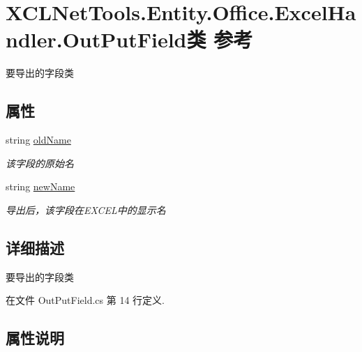 \hypertarget{class_x_c_l_net_tools_1_1_entity_1_1_office_1_1_excel_handler_1_1_out_put_field}{}\section{X\+C\+L\+Net\+Tools.\+Entity.\+Office.\+Excel\+Handler.\+Out\+Put\+Field类 参考}
\label{class_x_c_l_net_tools_1_1_entity_1_1_office_1_1_excel_handler_1_1_out_put_field}


要导出的字段类  


\subsection*{属性}
\begin{DoxyCompactItemize}
\item 
string \hyperlink{class_x_c_l_net_tools_1_1_entity_1_1_office_1_1_excel_handler_1_1_out_put_field_a6f62cc17246410ac6f6a352cd04bc1a2}{old\+Name}
\begin{DoxyCompactList}\small\item\em 该字段的原始名 \end{DoxyCompactList}\item 
string \hyperlink{class_x_c_l_net_tools_1_1_entity_1_1_office_1_1_excel_handler_1_1_out_put_field_a5889d2738a4a65d809b67457e37429fd}{new\+Name}
\begin{DoxyCompactList}\small\item\em 导出后，该字段在\+E\+X\+C\+E\+L中的显示名 \end{DoxyCompactList}\end{DoxyCompactItemize}


\subsection{详细描述}
要导出的字段类 



在文件 Out\+Put\+Field.\+cs 第 14 行定义.



\subsection{属性说明}
